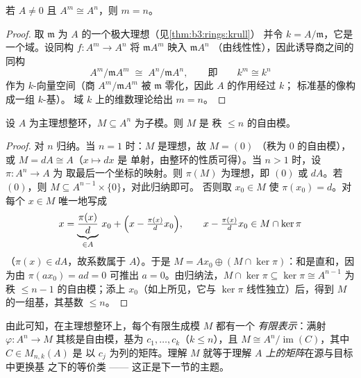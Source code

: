\begin{proposition}[秩的不变性]\label{prop:b3:modules:rank}
若 $A \neq 0$ 且 $A^m \cong A^n$，则 $m = n$。
\end{proposition}

\begin{proof}
取 $\mathfrak m$ 为 $A$ 的一个极大理想（见\cref{thm:b3:rings:krull}）
并令 $k = A/\mathfrak m$，它是一个域。设同构 $f \colon A^m
\to A^n$ 将 $\mathfrak m A^m$ 映入 $\mathfrak m A^n$
（由线性性），因此诱导商之间的同构
\[
A^m/\mathfrak m A^m \;\cong\; A^n/\mathfrak m A^n,
\qquad\text{即}\qquad k^m \cong k^n
\]
作为 $k$-向量空间（商 $A^m/\mathfrak m A^m$ 被
$\mathfrak m$ 零化，因此 $A$ 的作用经过 $k$；
标准基的像构成一组 $k$-基）。
域 $k$ 上的维数理论给出 $m = n$。
\end{proof}

\begin{theorem}[自由模的子模]\label{thm:b3:modules:submodule}
设 $A$ 为主理想整环，$M \subseteq A^n$ 为子模。则 $M$ 是
秩 $\leq n$ 的自由模。
\end{theorem}

\begin{proof}
对 $n$ 归纳。当 $n = 1$ 时：$M$ 是理想，故 $M = (0)$
（秩为 $0$ 的自由模），或 $M = dA \cong A$（$x \mapsto dx$ 是
单射，由整环的性质可得）。当 $n > 1$ 时，设 $\pi \colon A^n \to A$ 为
取最后一个坐标的映射。则 $\pi(M)$ 为理想，即 $(0)$ 或 $dA$。若
$(0)$，则 $M \subseteq A^{n-1} \times \{0\}$，对此归纳即可。
否则取 $x_0 \in M$ 使 $\pi(x_0) = d$。对每个 $x \in M$
唯一地写成
\[
x = \underbrace{\frac{\pi(x)}{d}}_{\in A}\, x_0 +
\Bigl(x - \tfrac{\pi(x)}d x_0\Bigr),
\qquad x - \tfrac{\pi(x)}d x_0 \in M \cap \ker\pi
\]
（$\pi(x) \in dA$，故系数属于 $A$）。于是 $M = Ax_0
\oplus (M \cap \ker \pi)$：和是直和，因为由 $\pi(ax_0) =
ad = 0$ 可推出 $a = 0$。由归纳法，$M \cap \ker\pi \subseteq
\ker \pi \cong A^{n-1}$ 为秩 $\leq n - 1$ 的自由模；添上
$x_0$（如上所见，它与 $\ker\pi$ 线性独立）后，得到
$M$ 的一组基，其基数 $\leq n$。
\end{proof}

\begin{remark}\label{rem:b3:modules:presentation}
由此可知，在主理想整环上，每个有限生成模 $M$ 都有一个
\emph{有限表示}：满射 $\varphi\colon A^n \to M$
其核是自由模，基为 $c_1, \dots, c_k$（$k \leq n$），且 $M
\cong A^n / \operatorname{im}(C)$，其中 $C \in M_{n,k}(A)$ 是
以 $c_j$ 为列的矩阵。理解 $M$ 就等于理解
\emph{$A$ 上的矩阵}在源与目标中更换基
之下的等价类 —— 这正是下一节的主题。
\end{remark}

